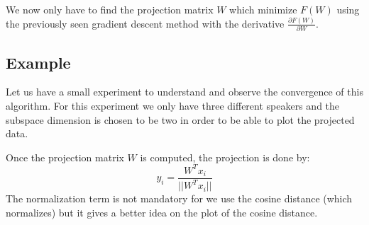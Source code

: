 \documentclass{techrep} %
\begin{document}
We now only have to find the projection matrix $W$ which minimize
$F(W)$ using the previously seen gradient descent method with the
derivative $\frac{\partial{F(W)}}{\partial{W}}$.


\subsection{Example}

Let us have a small experiment to understand and observe the
convergence of this algorithm.  For this experiment we only have three
different speakers and the subspace dimension is chosen to be two in
order to be able to plot the projected data.

Once the projection matrix $W$ is computed, the projection is done by:
$$y_i = \frac{W^Tx_i}{||W^Tx_i||}$$ The normalization term is not
mandatory for we use the cosine distance (which normalizes) but it
gives a better idea on the plot of the cosine distance.
\end{document}

